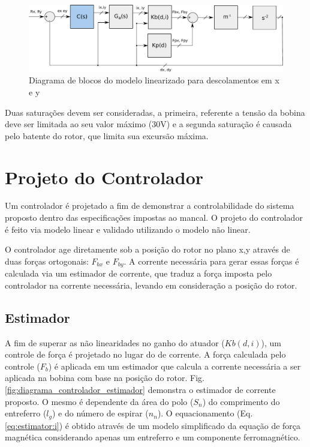 \begin{figure}[th!]
	\centering
	\includegraphics[width=1\linewidth]{../Figs/Modelagem/diagrama_blocos_modelo_linear}
	\caption{Diagrama de blocos do modelo linearizado para descolamentos em x e y}
	\label{fig:diagrama:blocos:modelo:linear}
\end{figure}

Duas saturações devem ser consideradas, a primeira, referente a tensão da bobina deve ser limitada ao seu valor máximo (30V) e a segunda saturação é causada pelo batente do rotor, que limita sua excursão máxima.

\section{Projeto do Controlador}

Um controlador é projetado a fim de demonstrar a controlabilidade do sistema proposto dentro das especificações impostas ao mancal. O projeto do controlador é feito via modelo linear e validado utilizando o modelo não linear. 

O controlador age diretamente sob a posição do rotor no plano x,y através de duas forças ortogonais: $F_{bx}$ e $F_{by}$. A corrente necessária para gerar essas forças é calculada via um estimador de corrente, que traduz a força imposta pelo controlador na corrente necessária, levando em consideração a posição do rotor.


\subsection{Estimador}
	
A fim de superar as não linearidades no ganho do atuador ($Kb(d,i)$), um controle de força é projetado no lugar do de corrente. A força calculada pelo controle ($F_b$) é aplicada em um estimador que calcula a corrente necessária a ser aplicada na bobina com base na posição do rotor. Fig. \ref{fig:diagrama_controlador_estimador} demonstra o estimador de corrente proposto. O mesmo é dependente da área do polo ($S_n$) do comprimento do entreferro ($l_g$) e do número de espirar ($n_n$). O equacionamento (Eq. \eqref{eq:estimator:i}) é obtido através de um modelo simplificado da equação de força magnética considerando apenas um entreferro e um componente ferromagnético.

